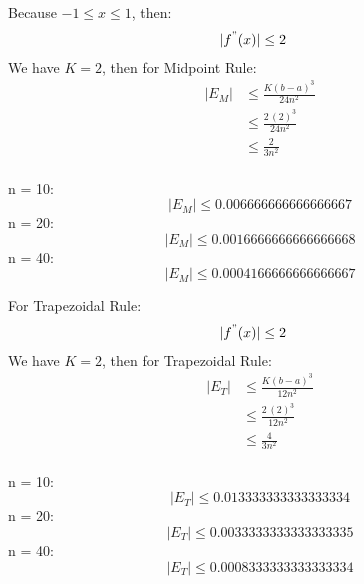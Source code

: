 \documentclass{article}
\begin{document}
    Because $-1 \leq x \leq 1$, then:
    \begin{align*}
        |f^{"}(x)| & \leq 2
    \end{align*}
    We have $K = 2$, then for Midpoint Rule:
    \begin{align*}
        |E_{M}| &\leq \frac{K(b-a)^{3}}{24n^2} \\
        &\leq \frac{2\,(2)^3}{24n^2} \\
        &\leq \frac{2}{3n^2}
    \end{align*} \\

    n = 10: \\
    $$ |E_{M}| \leq 0.006666666666666667 $$
    n = 20: \\
    $$ |E_{M}| \leq 0.0016666666666666668 $$
    n = 40: \\
    $$ |E_{M}| \leq 0.0004166666666666667 $$

    For Trapezoidal Rule:
    \begin{align*}
        |f^{"}(x)| & \leq 2
    \end{align*}
    We have $K = 2$, then for Trapezoidal Rule:
    \begin{align*}
        |E_{T}| &\leq \frac{K(b-a)^{3}}{12n^2} \\
        &\leq \frac{2\,(2)^3}{12n^2} \\
        &\leq \frac{4}{3n^2}
    \end{align*} \\

    n = 10: \\
    $$ |E_{T}| \leq 0.013333333333333334 $$
    n = 20: \\
    $$ |E_{T}| \leq 0.0033333333333333335 $$
    n = 40: \\
    $$ |E_{T}| \leq 0.0008333333333333334 $$ \\\\
\end{document}
